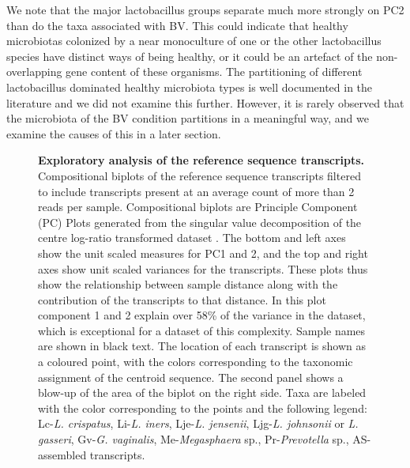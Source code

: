 \documentclass[10pt,letterpaper]{article}
\begin{document}
We note that the major lactobacillus groups separate much more strongly on PC2 than do the taxa associated with BV. This could indicate that healthy microbiotas colonized by a near monoculture of one or the other lactobacillus species have distinct ways of being healthy, or it could be an artefact of the non-overlapping gene content of these organisms. The partitioning of different lactobacillus dominated healthy microbiota types is well documented in the literature \cite{Ravel:2010, Hummelen:2010,mcmillan:2015}   and we did not examine this further. However, it is rarely observed that the microbiota of the BV condition partitions in a meaningful way, and we examine the causes of this in a later section.

\begin{figure}[h]
\caption{{\bf Exploratory analysis of the reference sequence transcripts.}
Compositional biplots of the reference sequence transcripts filtered to include transcripts present at an average count of more than 2 reads per sample. Compositional biplots are Principle Component (PC) Plots generated from the singular value decomposition of the centre log-ratio transformed dataset \cite{aitchison2002biplots}. The bottom and left axes show the unit scaled measures for PC1 and 2, and the top and right axes show unit scaled variances for the transcripts. These plots thus show the relationship between sample distance along with the contribution of the transcripts to that distance. In this plot component 1 and 2 explain over 58\% of the variance in the dataset, which is exceptional for a dataset of this complexity. Sample names are shown in black text. The location of each transcript is shown as a coloured point, with the colors corresponding to the taxonomic assignment of the centroid sequence. The second panel shows a blow-up of the area of the biplot on the right side. Taxa are labeled with the  color corresponding to the points and the following legend: Lc-\emph{L. crispatus},  Li-\emph{L. iners},  Lje-\emph{L. jensenii}, Ljg-\emph{L. johnsonii} or \emph{L. gasseri}, Gv-\emph{G. vaginalis}, Me-\emph{Megasphaera} sp., Pr-\emph{Prevotella} sp., AS- assembled transcripts. }
\label{F2:refseq_biplot}
\end{figure}
\end{document}
